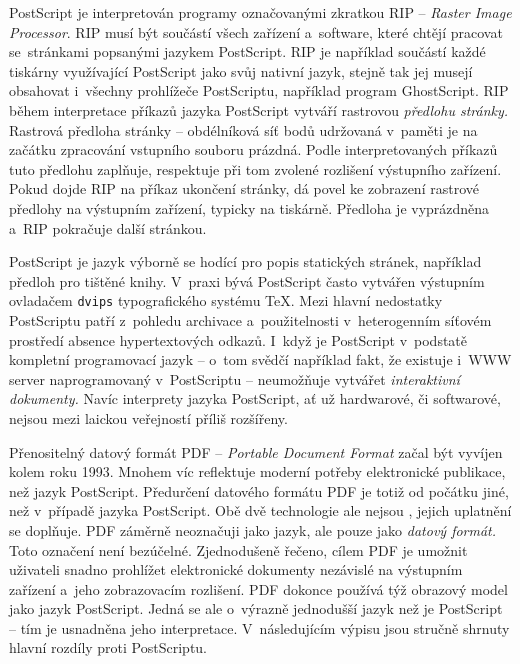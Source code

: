 \documentclass[12pt]{article}
\begin{document}
\medskip
PostScript je interpretován programy označovanými zkratkou
RIP -- \emph{\mbox{Raster} \mbox{Image} \mbox{Processor}}.
RIP musí být součástí všech zařízení a~software,
které chtějí pracovat se~stránkami popsanými jazykem PostScript.
RIP je například součástí každé tiskárny využívající PostScript
jako svůj nativní jazyk, stejně tak jej musejí obsahovat i~všechny prohlížeče
PostScriptu, například program \mbox{GhostScript}.
RIP během interpretace příkazů jazyka PostScript vytváří 
rastrovou \emph{předlohu stránky. }
Rastrová předloha stránky -- obdélníková síť bodů udržovaná v~paměti je 
na začátku zpracování vstupního souboru prázdná. 
Podle interpretovaných příkazů tuto předlohu zaplňuje,
respektuje při tom zvolené rozlišení výstupního zařízení.
Pokud dojde RIP na příkaz ukončení stránky, dá povel ke zobrazení rastrové
předlohy na výstupním zařízení, typicky na tiskárně.
Předloha je vyprázdněna a~RIP pokračuje další stránkou.

\medskip
PostScript je jazyk výborně se hodící pro popis statických stránek,
například předloh pro tištěné knihy. V~praxi bývá PostScript často vytvářen
výstupním ovladačem \texttt{dvips} typografického systému \TeX.
Mezi hlavní nedostatky PostScriptu patří z~pohledu archivace a~použitelnosti
v~heterogenním síťovém prostředí absence hypertextových odkazů.
I~když je PostScript v~podstatě kompletní programovací jazyk --
o~tom svědčí například fakt, že existuje i~WWW server naprogramovaný 
v~PostScriptu -- neumožňuje vytvářet \emph{interaktivní dokumenty.}
Navíc interprety jazyka PostScript, ať už hardwarové, či softwarové,
nejsou mezi laickou veřejností příliš rozšířeny.

\medskip
Přenositelný datový formát PDF -- \emph{Portable Document Format} začal být
vyvíjen kolem roku 1993. Mnohem víc reflektuje moderní potřeby elektronické
publikace, než jazyk PostScript. Předurčení datového formátu PDF je totiž
od počátku jiné, než v~případě jazyka PostScript. Obě dvě technologie ale
nejsou , jejich uplatnění se doplňuje.
PDF záměrně neoznačuji jako jazyk, 
ale pouze jako \emph{datový formát.}
Toto označení není bezúčelné. Zjednodušeně řečeno, cílem PDF je umožnit
uživateli snadno prohlížet elektronické dokumenty
nezávislé na výstupním zařízení a~jeho zobrazovacím rozlišení.
PDF dokonce používá týž obrazový model jako jazyk PostScript.
Jedná se ale o~výrazně jednodušší jazyk než je PostScript -- tím je
usnadněna jeho interpretace. V~následujícím výpisu jsou stručně shrnuty
hlavní rozdíly proti PostScriptu.
\end{document}
